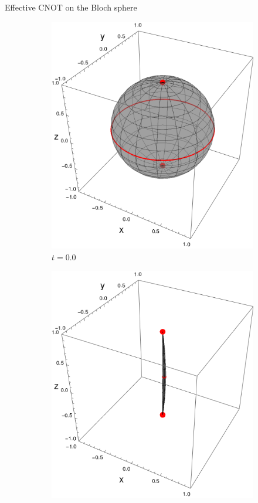 \begin{frame}{Effective CNOT on the Bloch sphere}
    \begin{figure}[h!]
        \centering
        \begin{subfigure}{0.32\textwidth}
            \centering
            \includegraphics[width=0.9\linewidth]{figures/sphere_CNOT_t=0.0_z=0.8_p=0.95.png}
            \caption{$t=0.0$}
        \end{subfigure}%
        \begin{subfigure}{0.32\textwidth}
            \centering
            \includegraphics[width=0.9\linewidth]{figures/sphere_CNOT_t=1.0_z=0.8_p=0.95.png}

\end{subfigure}
\end{figure}
\end{frame}
